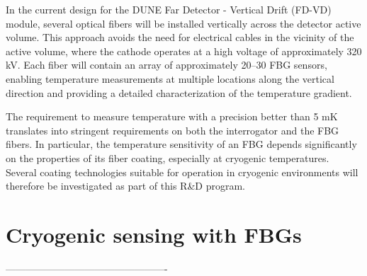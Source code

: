 \documentclass[preprint,11pt]{elsarticle}
\begin{document}
In the current design for the DUNE Far Detector - Vertical Drift (FD-VD) module, several optical fibers will be installed vertically across the detector active volume. This approach avoids the need for electrical cables in the vicinity of the active volume, where the cathode operates at a high voltage of approximately 320 kV. Each fiber will contain an array of approximately 20–30 FBG sensors, enabling temperature measurements at multiple locations along the vertical direction and providing a detailed characterization of the temperature gradient.

The requirement to measure temperature with a precision better than 5 mK translates into stringent requirements on both the interrogator and the FBG fibers. In particular, the temperature sensitivity of an FBG depends significantly on the properties of its fiber coating, especially at cryogenic temperatures. Several coating technologies suitable for operation in cryogenic environments will therefore be investigated as part of this R\&D program.



\section{Cryogenic sensing with FBGs}
\label{sec:fbgs}


-------------------------------------------------
\end{document}
